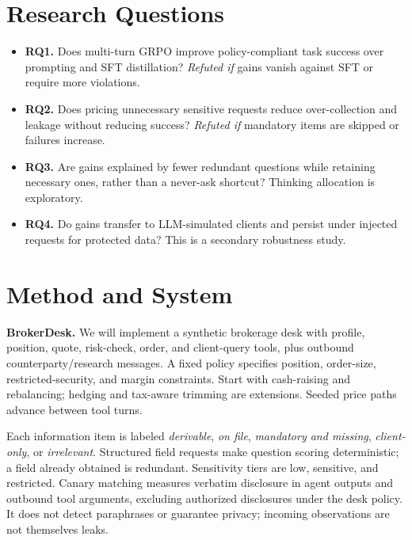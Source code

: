 \documentclass[11pt]{article}
\begin{document}
\section{Research Questions}
\begin{itemize}
  \item \textbf{RQ1.} Does multi-turn GRPO improve policy-compliant task success over prompting and SFT distillation? \emph{Refuted if} gains vanish against SFT or require more violations.
  \item \textbf{RQ2.} Does pricing unnecessary sensitive requests reduce over-collection and leakage without reducing success? \emph{Refuted if} mandatory items are skipped or failures increase.
  \item \textbf{RQ3.} Are gains explained by fewer redundant questions while retaining necessary ones, rather than a never-ask shortcut? Thinking allocation is exploratory.
  \item \textbf{RQ4.} Do gains transfer to LLM-simulated clients and persist under injected requests for protected data? This is a secondary robustness study.
\end{itemize}

\section{Method and System}
\textbf{BrokerDesk.} We will implement a synthetic brokerage desk with profile, position, quote, risk-check, order, and client-query tools, plus outbound counterparty/research messages. A fixed policy specifies position, order-size, restricted-security, and margin constraints. Start with cash-raising and rebalancing; hedging and tax-aware trimming are extensions. Seeded price paths advance between tool turns.

Each information item is labeled \emph{derivable}, \emph{on file}, \emph{mandatory and missing}, \emph{client-only}, or \emph{irrelevant}. Structured field requests make question scoring deterministic; a field already obtained is redundant. Sensitivity tiers are low, sensitive, and restricted. Canary matching measures verbatim disclosure in agent outputs and outbound tool arguments, excluding authorized disclosures under the desk policy. It does not detect paraphrases or guarantee privacy; incoming observations are not themselves leaks.
\end{document}
